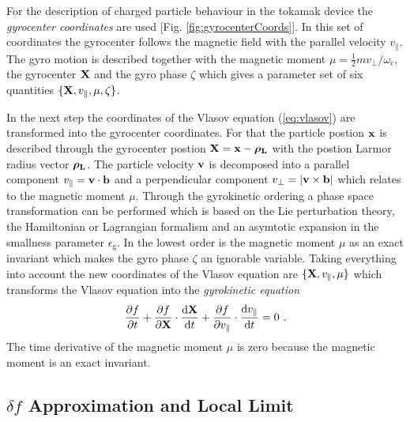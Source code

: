 For the description of charged particle behaviour in the tokamak device the \textit{gyrocenter coordinates} are used [Fig. \ref{fig:gyrocenterCoords}]. In this set of coordinates the gyrocenter follows the magnetic field with the parallel velocity $v_{\parallel}$. The gyro motion is described together with the magnetic moment $\mu = \frac{1}{2}mv_\perp/\omega_\mathrm{c}$, the gyrocenter $\boldsymbol{\mathbf{X}}$ and the gyro phase $\zeta$ which gives a parameter set of six quantities $\{\boldsymbol{\mathbf{X}}, v_{\parallel}, \mu, \zeta\}$.


In the next step the coordinates of the Vlasov equation (\ref{eq:vlasov}) are transformed into the gyrocenter coordinates. For that the particle postion $\boldsymbol{\mathbf{x}}$ is described through the gyrocenter postion $\boldsymbol{\mathbf{X}} = \boldsymbol{\mathbf{x}} - \boldsymbol{\mathbf{\rho_\mathrm{L}}}$ with the postion Larmor radius vector $\boldsymbol{\mathbf{\rho_\mathrm{L}}}$. The particle velocity $\boldsymbol{\mathbf{v}}$ is decomposed into a parallel component $v_\parallel = \boldsymbol{\mathbf{v}} \cdot \boldsymbol{\mathbf{b}}$ and 
a perpendicular component $v_\perp = |\boldsymbol{\mathbf{v}} \times \boldsymbol{\mathbf{b}}|$ which relates to the magnetic moment $\mu$. Through the gyrokinetic ordering a phase space transformation can be performed which is based on the Lie perturbation theory, the Hamiltonian or Lagrangian formalism and an asymtotic expansion in the smallness parameter $\epsilon_\mathrm{g}$. In the lowest order is the magnetic moment $\mu$ as an exact invariant which makes the gyro phase $\zeta$ an ignorable variable. \cite{Garbet2010,Cary1981,Cary1983} Taking everything into account the new coordinates of the Vlasov equation are $\{\boldsymbol{\mathbf{X}}, v_{\parallel}, \mu\}$ which transforms the Vlasov equation into the \textit{gyrokinetic equation}
\begin{gather}
	\frac{\partial f}{\partial t} + \frac{\partial f}{\partial \boldsymbol{\mathbf{X}}} \cdot \frac{\mathrm{d}\boldsymbol{\mathbf{X}}}{\mathrm{d}t} + \frac{\partial f}{\partial v_\parallel} \cdot \frac{\mathrm{d}v_\parallel}{\mathrm{d}t} = 0~.
	\label{eq:gyrokinetic}
\end{gather}
The time derivative of the magnetic moment $\mu$ is zero because the magnetic moment is an exact invariant. 

\subsection{$\delta f$ Approximation and Local Limit}
\label{sub:application}


